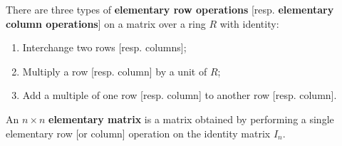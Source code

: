 There are three types of \textbf{elementary row operations} [resp. \textbf{elementary column operations}] on a matrix over a ring $R$ with identity:
\begin{enumerate}
\item Interchange two rows [resp. columns];
\item Multiply a row [resp. column] by a unit of $R$;
\item Add a multiple of one row [resp. column] to another row [resp. column].
\end{enumerate}
An $n \times n$ \textbf{elementary matrix} is a matrix obtained by performing a single elementary row [or column] operation on the identity matrix $I_n$.
